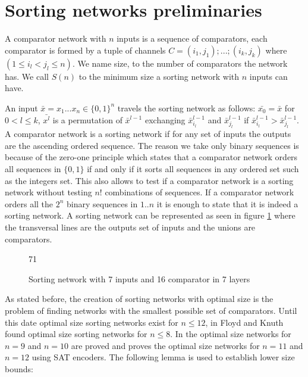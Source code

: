 \documentclass[../main.tex]{subfiles}
\begin{document}
	\section{Sorting networks preliminaries}
	A comparator network with $n$ inputs is a sequence of comparators, each comparator is formed by a tuple of channels $C=(i_1,j_1);...;(i_k,j_k)$ where $(1 \leq i_l < j_l \leq n)$. We name size, to the number of comparators the network has. We call $S(n)$ to the minimum size a sorting network with $n$ inputs can have.
	
	An input $\bar{x}=x_1...x_n \in \{0, 1\}^n$ travels the sorting network as follows: $\bar{x_0}=\bar{x}$ for $0<l\leq k$, $\bar{x^l}$ is a permutation of $\bar x^{l-1}$ exchanging $\bar x^{l-1}_{i_l}$ and $\bar x^{l-1}_{j_l}$ if $\bar x^{l-1}_{i_l} > \bar x^{l-1}_{j_l}$.
	A comparator network is a sorting network if for any set of inputs the outputs are the ascending ordered sequence. The reason we take only binary sequences is because of the zero-one principle\cite{knuth1997art} which states that a comparator network orders all sequences in $\{0,1\}$ if and only if it sorts all sequences in any ordered set such as the integers set. This also allows to test if a comparator network is a sorting network without testing $n!$ combinations of sequences. If a comparator network orders all the $2^n$ binary sequences in $1..n$ it is enough to state that it is indeed a sorting network. A sorting network can be represented as seen in figure \ref{sortingNetwork1} where the transversal lines are the outputs set of inputs and the unions are comparators.
	
	\begin{figure}[H]
		\centering
		\begin{sortingnetwork}7{1}
			\nextlayer
			\addlayer
			\nextlayer
			\nextlayer
			\nextlayer
			\addlayer
			\nextlayer
			\nextlayer
			\nextlayer
		\end{sortingnetwork}
		\caption{Sorting network with 7 inputs and 16 comparator in 7 layers}
		\label{sortingNetwork1}
	\end{figure}

	As stated before, the creation of sorting networks with optimal size is the problem of finding networks with the smallest possible set of comparators. Until this date optimal size sorting networks exist for $n \leq 12$, in \cite{FLOYD1973163} Floyd and Knuth found optimal size sorting networks for $n \leq 8$. In \cite{sortingnineinputs} the optimal size networks for $n = 9$ and $n = 10$ are proved and \cite{harder2021answer} proves the optimal size networks for $n = 11$ and $n = 12$ using SAT encoders. The following lemma \cite{VanVoorhis1972} is used to establish lower size bounds:
	
\end{document}
